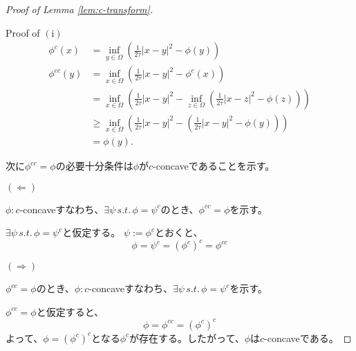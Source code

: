 \documentclass{jsarticle}
\theoremstyle{definition}
\begin{document}
\begin{proof}[Proof of Lemma \ref{lem:c-transform}]
  \hypertarget{proof:lem:c-transform}{}

  Proof of $(\mathrm{i})$
  \begin{align*}
            \phi^c(x)    &= \inf_{y\in\Omega} \left(\frac{1}{2 \tau}|x - y|^2 - \phi(y)\right)\\
            \phi^{cc}(y) &= \inf_{x\in\Omega} \left(\frac{1}{2 \tau}|x - y|^2 - \phi^c(x)\right)\\
                      &= \inf_{x\in\Omega} \left(\frac{1}{2 \tau}|x - y|^2 - \inf_{z\in\Omega} \left(\frac{1}{2 \tau}|x - z|^2 - \phi(z)\right)\right)\\
                      &\ge  \inf_{x\in\Omega} \left(\frac{1}{2 \tau}|x - y|^2 - \left(\frac{1}{2 \tau}|x - y|^2 - \phi(y)\right)\right)\\
                      &= \phi(y).
  \end{align*}

次に$\phi^{cc} = \phi$の必要十分条件は$\phi$が$c$-concaveであることを示す。

$(\Leftarrow)$

$\phi: c$-concaveすなわち、$\exists \psi \, s.t. \, \phi = \psi^c$のとき、$\phi^{cc} = \phi$を示す。

$\exists \psi \, s.t. \, \phi = \psi^c$と仮定する。
$\psi := \phi^c$とおくと、
$$
    \phi = \psi^c = (\phi^c)^c= \phi^{cc}
$$

$(\Rightarrow)$

$\phi^{cc} = \phi$のとき、$\phi: c$-concaveすなわち、$\exists \psi \, s.t. \, \phi = \psi^c$を示す。

$\phi^{cc} = \phi$と仮定すると、
$$
    \phi = \phi^{cc} = (\phi^c)^c
$$
よって、$\phi = (\phi^c)^c$となる$\phi^c$が存在する。したがって、$\phi$は$c$-concaveである。



\end{proof}
\end{document}
